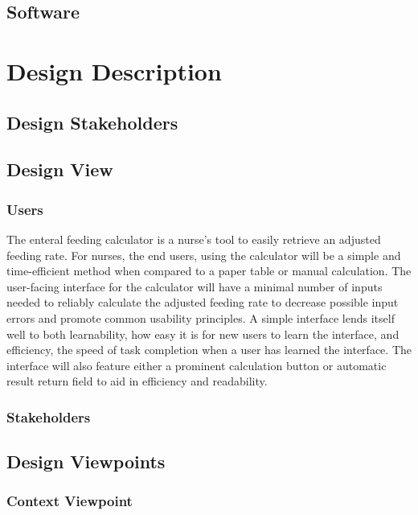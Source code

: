 \documentclass[onecolumn, draftclsnofoot,10pt, compsoc]{IEEEtran}
\begin{document}
\subsection{Software}

\section{Design Description}
\subsection{Design Stakeholders}

\subsection{Design View}
\subsubsection{Users}
The enteral feeding calculator is a nurse's tool to easily retrieve an adjusted feeding rate.
For nurses, the end users, using the calculator will be a simple and time-efficient method when compared to a paper table or manual calculation.
The user-facing interface for the calculator will have a minimal number of inputs needed to reliably calculate the adjusted feeding rate to decrease possible input errors and promote common usability principles.
A simple interface lends itself well to both learnability, how easy it is for new users to learn the interface, and efficiency, the speed of task completion when a user has learned the interface.
The interface will also feature either a prominent calculation button or automatic result return field to aid in efficiency and readability.
\subsubsection{Stakeholders}%


\subsection{Design Viewpoints}
\subsubsection{Context Viewpoint}
\end{document}
